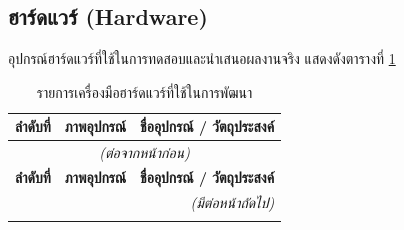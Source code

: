 \clearpage
\subsection{ฮาร์ดแวร์ (Hardware)}

อุปกรณ์ฮาร์ดแวร์ที่ใช้ในการทดสอบและนำเสนอผลงานจริง แสดงดังตารางที่ \ref{tab:hardware}

\begin{longtable}{@{}c >{\centering\arraybackslash}p{} >{\raggedright\arraybackslash}p{}@{}}
    \caption{รายการเครื่องมือฮาร์ดแวร์ที่ใช้ในการพัฒนา}
    \label{tab:hardware} \\
    \toprule
    \textbf{ลำดับที่} & \textbf{ภาพอุปกรณ์} & \textbf{ชื่ออุปกรณ์ / วัตถุประสงค์} \\
    \midrule
    \endfirsthead

    \multicolumn{3}{c}{\textit{(ต่อจากหน้าก่อน)}} \\
    \toprule
    \textbf{ลำดับที่} & \textbf{ภาพอุปกรณ์} & \textbf{ชื่ออุปกรณ์ / วัตถุประสงค์} \\
    \midrule
    \endhead

    \midrule
    \multicolumn{3}{r}{\textit{(มีต่อหน้าถัดไป)}} \\
    \bottomrule
    \endfoot

    \bottomrule
    \endlastfoot


\end{longtable}
